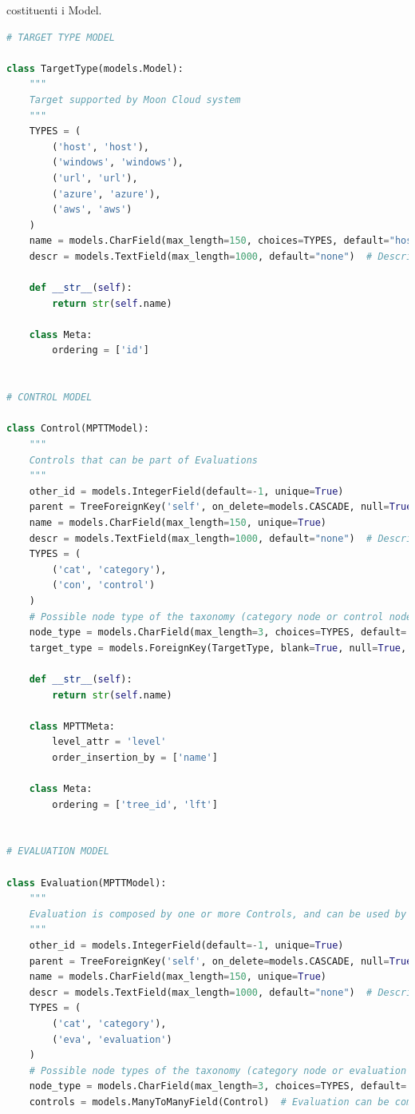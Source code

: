 costituenti i Model.
%
\lstset{style=python_code_style}
\begin{lstlisting}[language=Python, label=lst:model, caption={Parti principali del codice dei Models della soluzione.}]
# TARGET TYPE MODEL
 
class TargetType(models.Model):
    """
    Target supported by Moon Cloud system
    """
    TYPES = (
        ('host', 'host'),
        ('windows', 'windows'),
        ('url', 'url'),
        ('azure', 'azure'),
        ('aws', 'aws')
    )
    name = models.CharField(max_length=150, choices=TYPES, default="host")
    descr = models.TextField(max_length=1000, default="none")  # Description of a target
 
    def __str__(self):
        return str(self.name)
 
    class Meta:
        ordering = ['id']
 
 
# CONTROL MODEL
 
class Control(MPTTModel):
    """
    Controls that can be part of Evaluations
    """
    other_id = models.IntegerField(default=-1, unique=True)
    parent = TreeForeignKey('self', on_delete=models.CASCADE, null=True, blank=True, related_name='children')
    name = models.CharField(max_length=150, unique=True)
    descr = models.TextField(max_length=1000, default="none")  # Description of a node in the taxonomy
    TYPES = (
        ('cat', 'category'),
        ('con', 'control')
    )
    # Possible node type of the taxonomy (category node or control node)
    node_type = models.CharField(max_length=3, choices=TYPES, default='cat')
    target_type = models.ForeignKey(TargetType, blank=True, null=True, on_delete=models.CASCADE)  # It's null for the root node and category nodes
 
    def __str__(self):
        return str(self.name)
 
    class MPTTMeta:
        level_attr = 'level'
        order_insertion_by = ['name']
 
    class Meta:
        ordering = ['tree_id', 'lft']
 
 
# EVALUATION MODEL
 
class Evaluation(MPTTModel):
    """
    Evaluation is composed by one or more Controls, and can be used by Users
    """
    other_id = models.IntegerField(default=-1, unique=True)
    parent = TreeForeignKey('self', on_delete=models.CASCADE, null=True, blank=True, related_name='children')
    name = models.CharField(max_length=150, unique=True)
    descr = models.TextField(max_length=1000, default="none")  # Description of a node in the taxonomy
    TYPES = (
        ('cat', 'category'),
        ('eva', 'evaluation')
    )
    # Possible node types of the taxonomy (category node or evaluation node)
    node_type = models.CharField(max_length=3, choices=TYPES, default='cat')
    controls = models.ManyToManyField(Control)  # Evaluation can be composed of one or more controls
 

\end{lstlisting}
